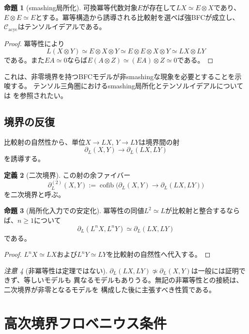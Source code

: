 \documentclass[11pt,a4paper]{ltjsarticle}
\theoremstyle{definition}
\newtheorem{definition}{定義}[section]
\newtheorem{proposition}[definition]{命題}
\theoremstyle{remark}
\newtheorem{remark}[definition]{注意}
\newcommand{\Cacyc}{\mathcal{C}_{\mathrm{acyc}}}
\newcommand{\cofib}{\operatorname{cofib}}
\newcommand{\Boundary}{\partial_L}
\begin{document}
\begin{proposition}[smashing局所化]
可換冪等代数対象$E$が存在して$LX\simeq E\otimes X$であり、
$E\otimes E\simeq E$とする。冪等構造から誘導される比較射を選べば強BFCが成立し、
$\Cacyc$はテンソルイデアルである。
\end{proposition}

\begin{proof}
冪等性により
\[
 L(X\otimes Y)\simeq E\otimes X\otimes Y
 \simeq E\otimes E\otimes X\otimes Y
 \simeq LX\otimes LY
\]
である。また$EA\simeq0$ならば$E(A\otimes Z)\simeq(EA)\otimes Z\simeq0$である。
\end{proof}

これは、非零境界を持つBFCモデルが非smashingな現象を必要とすることを示唆する。
テンソル三角圏におけるsmashing局所化とテンソルイデアルについては
\cite{BalmerFavi2011}を参照されたい。

\subsection{境界の反復}

比較射の自然性から、単位$X\to LX$, $Y\to LY$は境界間の射
\[
 \Boundary(X,Y)\longrightarrow\Boundary(LX,LY)
\]
を誘導する。

\begin{definition}[二次境界]
この射の余ファイバー
\[
 \Boundary^{(2)}(X,Y)
 :=\cofib\bigl(\Boundary(X,Y)\to\Boundary(LX,LY)\bigr)
\]
を二次境界と呼ぶ。
\end{definition}

\begin{proposition}[局所化入力での安定化]
冪等性の同値$L^2\simeq L$が比較射と整合するならば、$n\geq1$について
\[
 \Boundary(L^nX,L^nY)\simeq\Boundary(LX,LY)
\]
である。
\end{proposition}

\begin{proof}
$L^nX\simeq LX$および$L^nY\simeq LY$を比較射の自然性へ代入する。
\end{proof}

\begin{remark}[非冪等性は定理ではない]
$\Boundary(LX,LY)\not\simeq\Boundary(X,Y)$は一般には証明できず、等しいモデルも
異なるモデルもありうる。無記の非冪等性との接続は、二次境界が非零となるモデルを
構成した後に主張すべき性質である。
\end{remark}

\section{高次境界フロベニウス条件}
\end{document}
